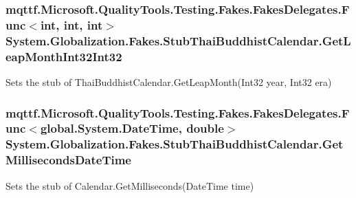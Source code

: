 \hypertarget{class_system_1_1_globalization_1_1_fakes_1_1_stub_thai_buddhist_calendar_ac449591cbfcd8a9eccc011492688deb7}{
\subsubsection[{Get\-Leap\-Month\-Int32\-Int32}]{\setlength{\rightskip}{0pt plus 5cm}mqttf.\-Microsoft.\-Quality\-Tools.\-Testing.\-Fakes.\-Fakes\-Delegates.\-Func$<$int, int, int$>$ System.\-Globalization.\-Fakes.\-Stub\-Thai\-Buddhist\-Calendar.\-Get\-Leap\-Month\-Int32\-Int32}}\label{class_system_1_1_globalization_1_1_fakes_1_1_stub_thai_buddhist_calendar_ac449591cbfcd8a9eccc011492688deb7}


Sets the stub of Thai\-Buddhist\-Calendar.\-Get\-Leap\-Month(\-Int32 year, Int32 era)

\hypertarget{class_system_1_1_globalization_1_1_fakes_1_1_stub_thai_buddhist_calendar_a0183cd8d3eaed039e42d1c7776b0ff4c}{
\subsubsection[{Get\-Milliseconds\-Date\-Time}]{\setlength{\rightskip}{0pt plus 5cm}mqttf.\-Microsoft.\-Quality\-Tools.\-Testing.\-Fakes.\-Fakes\-Delegates.\-Func$<$global.\-System.\-Date\-Time, double$>$ System.\-Globalization.\-Fakes.\-Stub\-Thai\-Buddhist\-Calendar.\-Get\-Milliseconds\-Date\-Time}}\label{class_system_1_1_globalization_1_1_fakes_1_1_stub_thai_buddhist_calendar_a0183cd8d3eaed039e42d1c7776b0ff4c}


Sets the stub of Calendar.\-Get\-Milliseconds(\-Date\-Time time)

